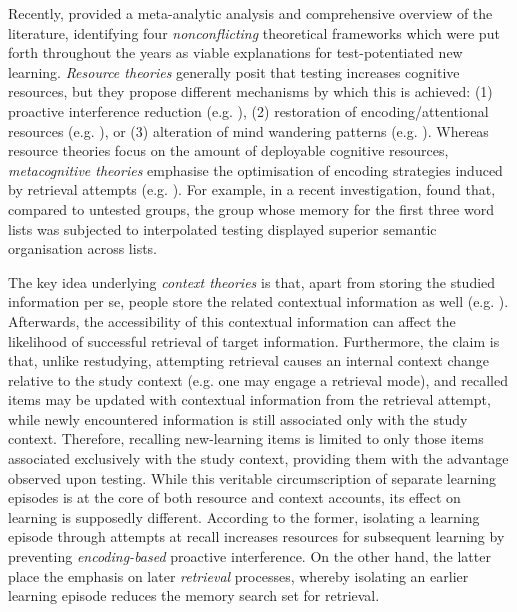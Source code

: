 \documentclass[../main.tex]{subfiles}
\begin{document}
Recently, \cite{chanRetrievalPotentiatesNew2018} provided a meta-analytic analysis and comprehensive overview of the literature, identifying four \textit{nonconflicting} theoretical frameworks which were put forth throughout the years as viable explanations for test-potentiated new learning. \textit{Resource theories} generally posit that testing increases cognitive resources, but they propose different mechanisms by which this is achieved: (1) proactive interference reduction (e.g. \citealp{wahlheimTestingCanCounteract2015, weinsteinTestingProtectsProactive2011, szpunarTestingStudyInsulates2008, nunesTestingImprovesTrue2012}), (2) restoration of encoding/attentional resources (e.g. \citealp{pastotterRetrievalLearningFacilitates2011}), or (3) alteration of mind wandering patterns (e.g. \citealp{jingInterpolatedTestingInfluences2016,szpunarInterpolatedMemoryTests2013,szpunarMindWanderingEducation2013}). Whereas resource theories focus on the amount of deployable cognitive resources, \textit{metacognitive theories} emphasise the optimisation of encoding strategies induced by retrieval attempts (e.g. \citealp{choTestingEnhancesBoth2017, chanTestingPotentiatesNew2018}). For example, in a recent investigation, \cite{chanTestingPotentiatesNew2018} found that, compared to untested groups, the group whose memory for the first three word lists was subjected to interpolated testing displayed superior semantic organisation across lists.

The key idea underlying \textit{context theories} is that, apart from storing the studied information per se, people store the related contextual information as well (e.g. \citealp{lehmanEpisodicContextAccount2014}). Afterwards, the accessibility of this contextual information can affect the likelihood of successful retrieval of target information. Furthermore, the claim is that, unlike restudying, attempting retrieval causes an internal context change relative to the study context (e.g. one may engage a retrieval mode), and recalled items may be updated with contextual information from the retrieval attempt, while newly encountered information is still associated only with the study context. Therefore, recalling new-learning items is limited to only those items associated exclusively with the study context, providing them with the advantage observed upon testing. While this veritable circumscription of separate learning episodes is at the core of both resource and context accounts, its effect on learning is supposedly different. According to the former, isolating a learning episode through attempts at recall increases resources for subsequent learning by preventing \textit{encoding-based} proactive interference. On the other hand, the latter place the emphasis on later \textit{retrieval} processes, whereby isolating an earlier learning episode reduces the memory search set for retrieval. 
\end{document}
